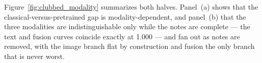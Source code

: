 Figure~\ref{fig:clubbed_modality} summarizes both halves. Panel~(a) shows that
the classical-versus-pretrained gap is modality-dependent, and panel~(b) that
the three modalities are indistinguishable only while the notes are complete
--- the text and fusion curves coincide exactly at 1.000 --- and fan out as
notes are removed, with the image branch flat by construction and fusion the
only branch that is never worst.
